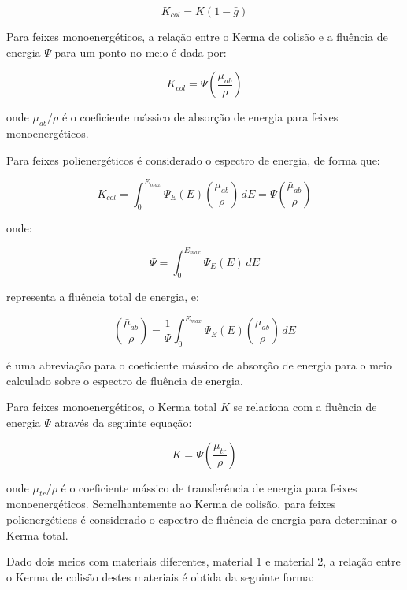 \documentclass[11pt,a4paper]{article}
\begin{document}
			\begin{equation}
				K_{col} = K(1 - \bar{g})
			\end{equation}

		Para feixes monoenergéticos, a relação entre o Kerma de colisão e a fluência de energia $\Psi$ para um ponto no meio é dada por:

			\begin{equation}
				K_{col} = \Psi \left(\frac{\mu_{ab}}{\rho}\right)
			\end{equation}

		\noindent onde $\mu_{ab}/\rho$ é o coeficiente mássico de absorção de energia para feixes monoenergéticos. 

		Para feixes polienergéticos é considerado o espectro de energia, de forma que:

			\begin{equation}
				K_{col} = \int_{0}^{E_{max}} \Psi_E(E) \left(\frac{\mu_{ab}}{\rho}\right)  \,dE 
				= \Psi \left(\frac{\bar{\mu}_{ab}}{\rho}\right)
			\end{equation}

		\noindent onde:

			$$\Psi = \int_{0}^{E_{max}} \Psi_E(E) \, dE$$

		\noindent representa a fluência total de energia, e:

			$$\left(\frac{\bar{\mu}_{ab}}{\rho}\right)
			= \frac{1}{\Psi} \int_{0}^{E_{max}} \Psi_E(E) \left(\frac{\mu_{ab}}{\rho}\right)  \,dE
			$$

		\noindent é uma abreviação para o coeficiente mássico de absorção de energia para o meio calculado sobre o espectro de fluência de energia.


		Para feixes monoenergéticos, o Kerma total $K$ se relaciona com a fluência de energia $\Psi$ através da seguinte equação:

		\begin{equation}
			K = \Psi \left(\frac{\mu_{tr}}{\rho}\right)
		\end{equation}

		\noindent onde $\mu_{tr}/\rho$ é o coeficiente mássico de transferência de energia para feixes monoenergéticos. Semelhantemente ao Kerma de colisão, para feixes polienergéticos é considerado o espectro de fluência de energia para determinar o Kerma total.


		Dado dois meios com materiais diferentes, material 1 e material 2, a relação entre o Kerma de colisão destes materiais é obtida da seguinte forma:
\end{document}
